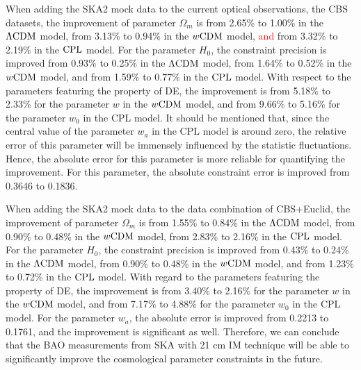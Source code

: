 \documentclass[aps,prd,amsmath,amssymb,showpacs,floats,floatfix,nofootinbib,reprint]{revtex4-1}
\def\red#1{{\textcolor{red}{#1}}} %
\begin{document}
When adding the SKA2 mock data to the current optical observations, the CBS datasets, the improvement of parameter $\Omega_{m}$ is from 2.65\% to 1.00\% in the ${\rm \Lambda CDM}$ model, from 3.13\% to 0.94\% in the  ${ w\rm CDM}$ model, \red{and} from 3.32\% to 2.19\% in the ${\rm CPL}$ model. For the parameter $H_{0}$, the constraint precision is improved from 0.93\% to 0.25\% in the ${\rm \Lambda CDM}$ model, from 1.64\% to 0.52\% in the ${ w\rm CDM}$ model, and from 1.59\% to 0.77\% in the ${\rm CPL}$ model. With respect to the parameters featuring the property of DE, the improvement is from 5.18\% to 2.33\% for the parameter $w$ in the ${ w\rm CDM}$ model, and from 9.66\% to 5.16\% for the parameter $w_{0}$ in the CPL model. It should be mentioned that, since the central value of the parameter $w_a$ in the CPL model is around zero, the relative error of this parameter will be immensely influenced by the statistic fluctuations. Hence, the absolute error for this parameter is more reliable for quantifying the improvement. For this parameter, the absolute constraint error is improved from 0.3646 to 0.1836.

When adding the SKA2 mock data to the data combination of CBS+Euclid, the improvement of parameter $\Omega_{m}$ is from 1.55\% to 0.84\% in the ${\rm \Lambda CDM}$ model, from 0.90\% to 0.48\% in the  ${ w\rm CDM}$ model, from 2.83\% to 2.16\% in the ${\rm CPL}$ model. For the parameter $H_{0}$, the constraint precision is improved from 0.43\% to 0.24\% in the ${\rm \Lambda CDM}$ model, from 0.90\% to 0.48\% in the ${ w\rm CDM}$ model, and from 1.23\% to 0.72\% in the ${\rm CPL}$ model. With regard to the parameters featuring the property of DE, the improvement is from 3.40\% to 2.16\% for the parameter $w$ in the ${ w\rm CDM}$ model, and from 7.17\% to 4.88\% for the parameter $w_{0}$ in the CPL model. For the parameter $w_a$, the absolute error is improved from 0.2213 to 0.1761, and the improvement is significant as well.
Therefore, we can conclude that the BAO measurements from SKA with 21 cm IM technique will be able to significantly improve the cosmological parameter constraints in the future.
\end{document}
